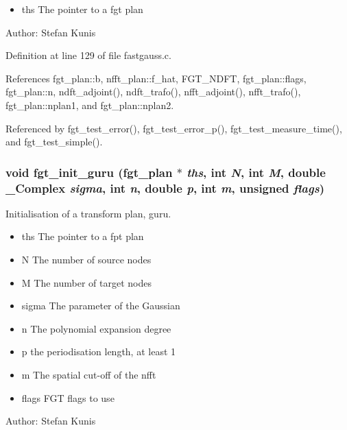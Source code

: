 \begin{itemize}
\item ths The pointer to a fgt plan\end{itemize}
\begin{Desc}
\item[Author:]Stefan Kunis \end{Desc}


Definition at line 129 of file fastgauss.c.

References fgt\_\-plan::b, nfft\_\-plan::f\_\-hat, FGT\_\-NDFT, fgt\_\-plan::flags, fgt\_\-plan::n, ndft\_\-adjoint(), ndft\_\-trafo(), nfft\_\-adjoint(), nfft\_\-trafo(), fgt\_\-plan::nplan1, and fgt\_\-plan::nplan2.

Referenced by fgt\_\-test\_\-error(), fgt\_\-test\_\-error\_\-p(), fgt\_\-test\_\-measure\_\-time(), and fgt\_\-test\_\-simple().\hypertarget{group__applications__fastgauss_g902eb9182c72c3c9293084a70523ebff}{
\subsubsection{\setlength{\rightskip}{0pt plus 5cm}void fgt\_\-init\_\-guru ({\bf fgt\_\-plan} $\ast$ {\em ths}, int {\em N}, int {\em M}, double \_\-Complex {\em sigma}, int {\em n}, double {\em p}, int {\em m}, unsigned {\em flags})}}
\label{group__applications__fastgauss_g902eb9182c72c3c9293084a70523ebff}


Initialisation of a transform plan, guru. 

\begin{itemize}
\item ths The pointer to a fpt plan \item N The number of source nodes \item M The number of target nodes \item sigma The parameter of the Gaussian \item n The polynomial expansion degree \item p the periodisation length, at least 1 \item m The spatial cut-off of the nfft \item flags FGT flags to use\end{itemize}
\begin{Desc}
\item[Author:]Stefan Kunis \end{Desc}



